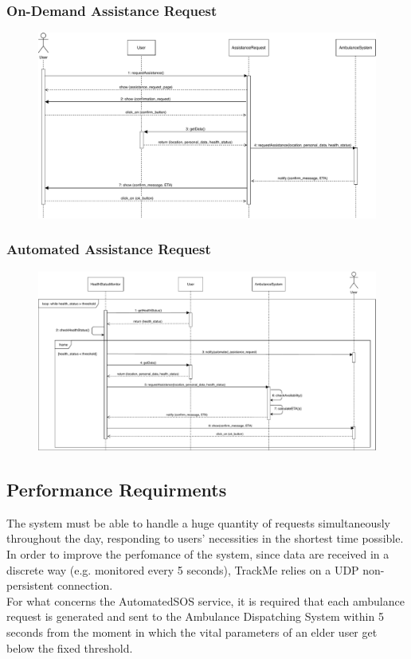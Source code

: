 \documentclass[12pt,a4paper]{article}
\begin{document}
		\subsubsection{On-Demand Assistance Request}
		\begin{figure}[H]
			\centering
			\includegraphics[width=1.2\linewidth]{Images/ass_request_sequence}
			\label{fig:ass_request_sequence}
		\end{figure}
		\subsubsection{Automated Assistance Request}
		\begin{figure}[H]
			\centering
			\includegraphics[width=1.2\linewidth]{Images/automated_request_sequence}
			\label{fig:automated_request_sequence}
		\end{figure}

	\subsection{Performance Requirments}
	The system must be able to handle a huge quantity of requests simultaneously throughout the day, responding to users' necessities in the shortest time possible. In order to improve the perfomance of the system, since data are received in a discrete way (e.g. monitored every 5 seconds), TrackMe relies on a UDP non-persistent connection.\\
	For what concerns the AutomatedSOS service, it is required that each ambulance request is generated and sent to the Ambulance Dispatching System within 5 seconds from the moment in which the vital parameters of an elder user get below the fixed threshold.
\end{document}
